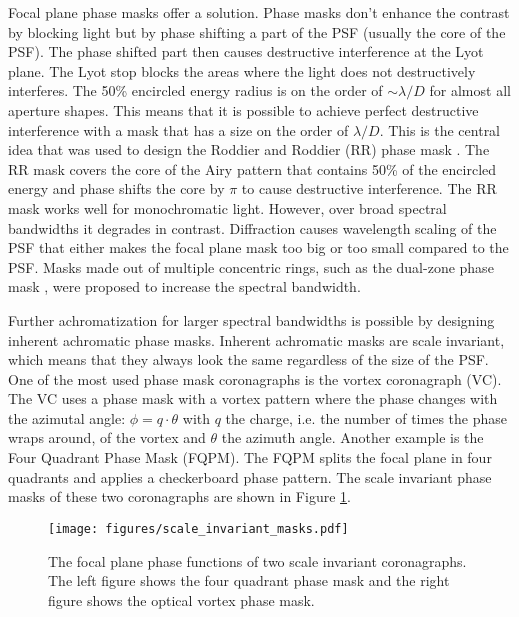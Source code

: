 \documentclass[letterpaper]{ar-1col}
\begin{document}
Focal plane phase masks offer a solution. Phase masks don't enhance the contrast by blocking light but by phase shifting a part of the PSF (usually the core of the PSF). The phase shifted part then causes destructive interference at the Lyot plane. The Lyot stop blocks the areas where the light does not destructively interferes. The 50\% encircled energy radius is on the order of $\sim \lambda/D$ for almost all aperture shapes. This means that it is possible to achieve perfect destructive interference with a mask that has a size on the order of $\lambda/D$. This is the central idea that was used to design the Roddier and Roddier (RR) phase mask \cite{roddier1997stellar}. The RR mask covers the core of the Airy pattern that contains 50\% of the encircled energy and phase shifts the core by $\pi$ to cause destructive interference. The RR mask works well for monochromatic light. However, over broad spectral bandwidths it degrades in contrast. Diffraction causes wavelength scaling of the PSF that either makes the focal plane mask too big or too small compared to the PSF. Masks made out of multiple concentric rings, such as the dual-zone phase mask \cite{soummer2003achromatic}, were proposed to increase the spectral bandwidth.

Further achromatization for larger spectral bandwidths is possible by designing inherent achromatic phase masks. Inherent achromatic masks are scale invariant, which means that they always look the same regardless of the size of the PSF. One of the most used phase mask coronagraphs is the vortex coronagraph (VC). The VC uses a phase mask with a vortex pattern where the phase changes with the azimutal angle: $\phi=q \cdot \theta$ with $q$ the charge, i.e. the number of times the phase wraps around, of the vortex and $\theta$ the azimuth angle. Another example is the Four Quadrant Phase Mask (FQPM). The FQPM splits the focal plane in four quadrants and applies a checkerboard phase pattern. The scale invariant phase masks of these two coronagraphs are shown in Figure \ref{fig:scale_invariant}.

\begin{figure}[ht]
  \centering
  \texttt{[image: figures/scale\_invariant\_masks.pdf]}
  \caption{The focal plane phase functions of two scale invariant coronagraphs. The left figure shows the four quadrant phase mask and the right figure shows the optical vortex phase mask.}
  \label{fig:scale_invariant}
\end{figure}
\end{document}
